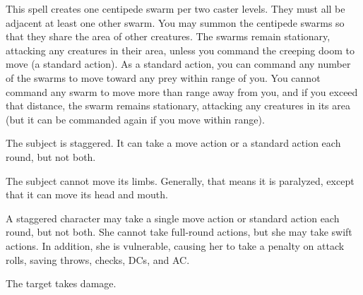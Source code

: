\spelldur{\durmed}
\begin{spelleffect}
  This spell creates one centipede swarm per two caster levels. They must all be adjacent at least one other swarm. You may summon the centipede swarms so that they share the area of other creatures. The swarms remain stationary, attacking any creatures in their area, unless you command the creeping doom to move (a standard action). As a standard action, you can command any number of the swarms to move toward any prey within \rngmed range of you. You cannot command any swarm to move more than \rngmed range away from you, and if you exceed that distance, the swarm remains stationary, attacking any creatures in its area (but it can be commanded again if you move within range).
\end{spelleffect}

\spellrng{\rngmed}
\spelldur{\durshort}
\begin{spellhealthy}
  The subject is staggered. It can take a move action or a standard action each round, but not both. 
\end{spellhealthy}
\begin{spellblood}
  The subject cannot move its limbs. Generally, that means it is paralyzed, except that it can move its head and mouth.
\end{spellblood}
\begin{spellnotes}
 A staggered character may take a single move action or standard action each round, but not both. She cannot take full-round actions, but she may take swift actions. In addition, she is vulnerable, causing her to take a  penalty on attack rolls, saving throws, checks, DCs, and AC.
\end{spellnotes}

\spellrng{\rngmed}
\begin{spelleffect}
  The target takes damage.
\end{spelleffect}

